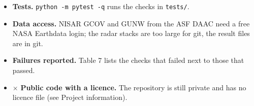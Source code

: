 \documentclass[10pt,twocolumn]{article}
\begin{document}
\begin{itemize}
\item{} \checkmark{} \textbf{Tests.} \texttt{python -\allowbreak{}m pytest -\allowbreak{}q} runs the checks in \texttt{tests/\allowbreak{}}.
\item{} \checkmark{} \textbf{Data access.} NISAR GCOV and GUNW from the ASF DAAC need a free NASA Earthdata login; the radar stacks are too large for git, the result files are in git.
\item{} \checkmark{} \textbf{Failures reported.} Table 7 lists the checks that failed next to those that passed.
\item{} $\times$ \textbf{Public code with a licence.} The repository is still private and has no licence file (see Project information).
\end{itemize}
\end{document}
